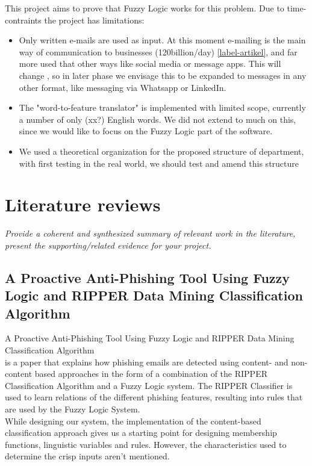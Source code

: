 \documentclass[a4paper]{article}
\begin{document}
This project aims to prove that Fuzzy Logic works for this problem. Due to time-contraints the project has limitations:
\begin{itemize}
    \item Only written e-mails are used as input. At this moment e-mailing is the main way of communication to businesses (120billion/day) \ref{label-artikel}, and far more used that other ways like social media or message apps. This will change , so in later phase we envisage this to be expanded to messages in any other format, like messaging via Whatsapp or LinkedIn.
    \item The "word-to-feature translator" is implemented with limited scope, currently a number of only (xx?) English words. We did not extend to much on this, since we would like to focus on the Fuzzy Logic part of the software.
    \item We used a theoretical organization for the proposed structure of department, with first testing in the real world, we should test and amend this structure
\end{itemize}
\section{Literature reviews}

\textit{Provide a coherent and synthesized summary of relevant work in the
literature, present the supporting/related evidence for your project.} \\

\subsection{A Proactive Anti-Phishing Tool Using Fuzzy Logic and RIPPER Data Mining Classification Algorithm}

A Proactive Anti-Phishing Tool Using Fuzzy Logic and RIPPER Data Mining Classification Algorithm \cite{phishing} \\ is a paper that explains how phishing emails are detected using content- and non-content based approaches in the form of a combination of the RIPPER Classification Algorithm and a Fuzzy Logic system. The RIPPER Classifier is used to learn relations of the different phishing features, resulting into rules that are used by the Fuzzy Logic System. \\

While designing our system, the implementation of the content-based classification approach gives us a starting point for designing membership functions, linguistic variables and rules. However, the characteristics used to determine the crisp inputs aren't mentioned.
\end{document}

